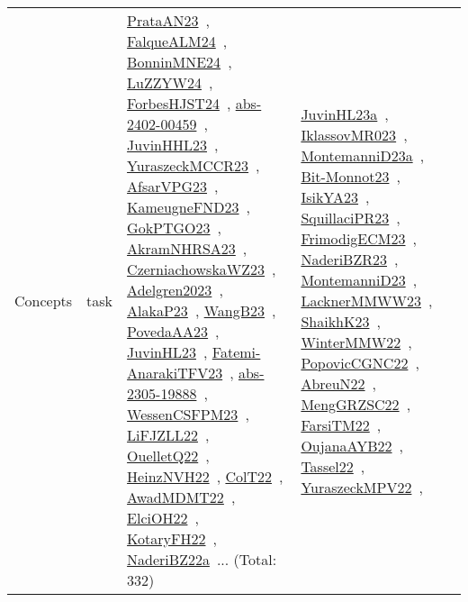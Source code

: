 {\begin{longtable}{lp{3cm}>{\raggedright\arraybackslash}p{6cm}>{\raggedright\arraybackslash}p{6cm}>{\raggedright\arraybackslash}p{8cm}}
\index{task}\index{Concepts!task}Concepts & task & \href{../works/PrataAN23.pdf}{PrataAN23}~\cite{PrataAN23}, \href{../works/FalqueALM24.pdf}{FalqueALM24}~\cite{FalqueALM24}, \href{../works/BonninMNE24.pdf}{BonninMNE24}~\cite{BonninMNE24}, \href{../works/LuZZYW24.pdf}{LuZZYW24}~\cite{LuZZYW24}, \href{../works/ForbesHJST24.pdf}{ForbesHJST24}~\cite{ForbesHJST24}, \href{../works/abs-2402-00459.pdf}{abs-2402-00459}~\cite{abs-2402-00459}, \href{../works/JuvinHHL23.pdf}{JuvinHHL23}~\cite{JuvinHHL23}, \href{../works/YuraszeckMCCR23.pdf}{YuraszeckMCCR23}~\cite{YuraszeckMCCR23}, \href{../works/AfsarVPG23.pdf}{AfsarVPG23}~\cite{AfsarVPG23}, \href{../works/KameugneFND23.pdf}{KameugneFND23}~\cite{KameugneFND23}, \href{../works/GokPTGO23.pdf}{GokPTGO23}~\cite{GokPTGO23}, \href{../works/AkramNHRSA23.pdf}{AkramNHRSA23}~\cite{AkramNHRSA23}, \href{../works/CzerniachowskaWZ23.pdf}{CzerniachowskaWZ23}~\cite{CzerniachowskaWZ23}, \href{../works/Adelgren2023.pdf}{Adelgren2023}~\cite{Adelgren2023}, \href{../works/AlakaP23.pdf}{AlakaP23}~\cite{AlakaP23}, \href{../works/WangB23.pdf}{WangB23}~\cite{WangB23}, \href{../works/PovedaAA23.pdf}{PovedaAA23}~\cite{PovedaAA23}, \href{../works/JuvinHL23.pdf}{JuvinHL23}~\cite{JuvinHL23}, \href{../works/Fatemi-AnarakiTFV23.pdf}{Fatemi-AnarakiTFV23}~\cite{Fatemi-AnarakiTFV23}, \href{../works/abs-2305-19888.pdf}{abs-2305-19888}~\cite{abs-2305-19888}, \href{../works/WessenCSFPM23.pdf}{WessenCSFPM23}~\cite{WessenCSFPM23}, \href{../works/LiFJZLL22.pdf}{LiFJZLL22}~\cite{LiFJZLL22}, \href{../works/OuelletQ22.pdf}{OuelletQ22}~\cite{OuelletQ22}, \href{../works/HeinzNVH22.pdf}{HeinzNVH22}~\cite{HeinzNVH22}, \href{../works/ColT22.pdf}{ColT22}~\cite{ColT22}, \href{../works/AwadMDMT22.pdf}{AwadMDMT22}~\cite{AwadMDMT22}, \href{../works/ElciOH22.pdf}{ElciOH22}~\cite{ElciOH22}, \href{../works/KotaryFH22.pdf}{KotaryFH22}~\cite{KotaryFH22}, \href{../works/NaderiBZ22a.pdf}{NaderiBZ22a}~\cite{NaderiBZ22a}... (Total: 332) & \href{../works/JuvinHL23a.pdf}{JuvinHL23a}~\cite{JuvinHL23a}, \href{../works/IklassovMR023.pdf}{IklassovMR023}~\cite{IklassovMR023}, \href{../works/MontemanniD23a.pdf}{MontemanniD23a}~\cite{MontemanniD23a}, \href{../works/Bit-Monnot23.pdf}{Bit-Monnot23}~\cite{Bit-Monnot23}, \href{../works/IsikYA23.pdf}{IsikYA23}~\cite{IsikYA23}, \href{../works/SquillaciPR23.pdf}{SquillaciPR23}~\cite{SquillaciPR23}, \href{../works/FrimodigECM23.pdf}{FrimodigECM23}~\cite{FrimodigECM23}, \href{../works/NaderiBZR23.pdf}{NaderiBZR23}~\cite{NaderiBZR23}, \href{../works/MontemanniD23.pdf}{MontemanniD23}~\cite{MontemanniD23}, \href{../works/LacknerMMWW23.pdf}{LacknerMMWW23}~\cite{LacknerMMWW23}, \href{../works/ShaikhK23.pdf}{ShaikhK23}~\cite{ShaikhK23}, \href{../works/WinterMMW22.pdf}{WinterMMW22}~\cite{WinterMMW22}, \href{../works/PopovicCGNC22.pdf}{PopovicCGNC22}~\cite{PopovicCGNC22}, \href{../works/AbreuN22.pdf}{AbreuN22}~\cite{AbreuN22}, \href{../works/MengGRZSC22.pdf}{MengGRZSC22}~\cite{MengGRZSC22}, \href{../works/FarsiTM22.pdf}{FarsiTM22}~\cite{FarsiTM22}, \href{../works/OujanaAYB22.pdf}{OujanaAYB22}~\cite{OujanaAYB22}, \href{../works/Tassel22.pdf}{Tassel22}~\cite{Tassel22}, \href{../works/YuraszeckMPV22.pdf}{YuraszeckMPV22}~\cite{YuraszeckMPV22}, 
\end{longtable}}
